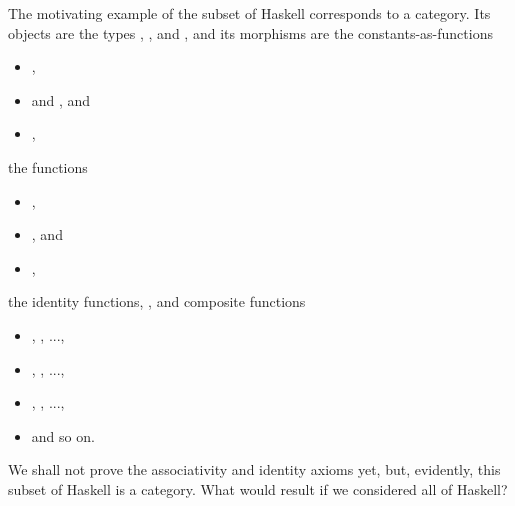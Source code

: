 \begin{example}
  \label{ex:category-haskell}


  The motivating example of the subset of Haskell corresponds to a
  category. Its objects are the types \texthaskell{()},
  , and , and its morphisms are the
  constants-as-functions
  \begin{itemize}
  \item
    \texthaskell{() :: () -> ()},

  \item
     and , and

  \item
    ,

  \end{itemize}
  the functions
  \begin{itemize}
  \item
    ,

  \item
    , and

  \item
    ,

  \end{itemize}
  the identity functions, , and composite functions
  \begin{itemize}
  \item
    , , ...,

  \item
    , , ...,

  \item
    , , ...,

  \item
    and so on.

  \end{itemize}
  We shall not prove the associativity and identity axioms yet, but,
  evidently, this subset of Haskell is a category. What would result
  if we considered all of Haskell?

\end{example}

